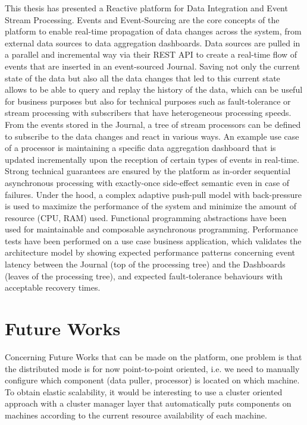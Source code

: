 This thesis has presented a Reactive platform for Data Integration and Event Stream Processing. Events and Event-Sourcing are the core concepts of the platform to enable 
real-time propagation of data changes across the system, from external data sources to data aggregation dashboards. Data sources are pulled in a parallel and incremental way via their REST API to create a real-time flow of events that are inserted in an event-sourced Journal. Saving not only the current state of the data but also all the data changes
that led to this current state allows to be able to query and replay the history of the data, which can be useful for business purposes but also for technical purposes such as fault-tolerance or stream processing with subscribers that have heterogeneous processing speeds.
From the events stored in the Journal, a tree of stream processors can be defined to subscribe to the data changes and react in various ways. An example use case of a processor is maintaining a specific data aggregation dashboard that is updated incrementally upon the reception of certain types of events in real-time. Strong technical guarantees are ensured by the platform as in-order sequential asynchronous processing with exactly-once side-effect semantic even in case of failures. Under the hood, a complex adaptive push-pull model with back-pressure is used to maximize the performance of the system and minimize the amount of resource (CPU, RAM) used. Functional programming abstractions have been used for maintainable and composable asynchronous programming.
Performance tests have been performed on a use case business application, which validates the architecture model by showing expected performance patterns concerning event latency between the Journal (top of the processing tree) and the Dashboards (leaves of the processing tree), and expected fault-tolerance behaviours with acceptable recovery times.


\section{Future Works}

Concerning Future Works that can be made on the platform, one problem is that the distributed mode is for now point-to-point oriented, i.e. we need to manually configure which component (data puller, processor) is located on which machine. To obtain elastic scalability, it would be interesting to use a cluster oriented approach with a cluster manager layer that automatically puts components on machines according to the current resource availability of each machine.
\\

